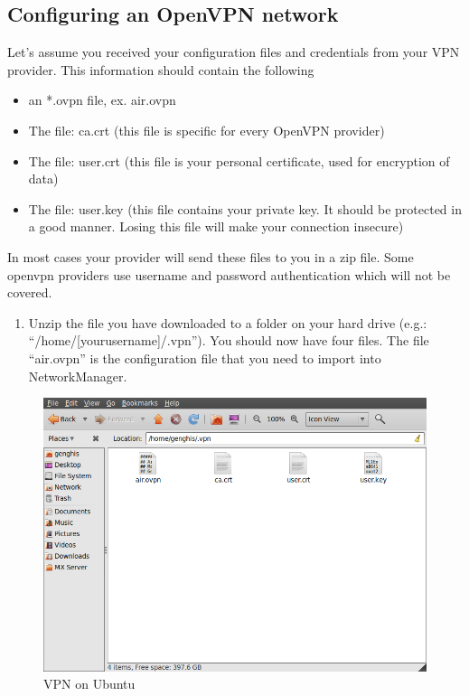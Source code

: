 \subsection{Configuring an OpenVPN network}

Let's assume you received your configuration files and credentials from
your VPN provider. This information should contain the following

\begin{itemize}
\item
  an *.ovpn file, ex. air.ovpn
\item
  The file: ca.crt (this file is specific for every OpenVPN provider)
\item
  The file: user.crt (this file is your personal certificate, used for
  encryption of data)
\item
  The file: user.key (this file contains your private key. It should be
  protected in a good manner. Losing this file will make your connection
  insecure)
\end{itemize}
In most cases your provider will send these files to you in a zip file.
Some openvpn providers use username and password authentication which
will not be covered.

\begin{enumerate}[1.]
\item
  Unzip the file you have downloaded to a folder on your hard drive
  (e.g.: ``/home/{[}yourusername{]}/.vpn''). You should now have four
  files. The file ``air.ovpn'' is the configuration file that you need
  to import into NetworkManager.
\end{enumerate}
\begin{figure}[htbp]
\centering
\includegraphics{vpn_ubuntu_008.png}
\caption{VPN on Ubuntu}
\end{figure}

